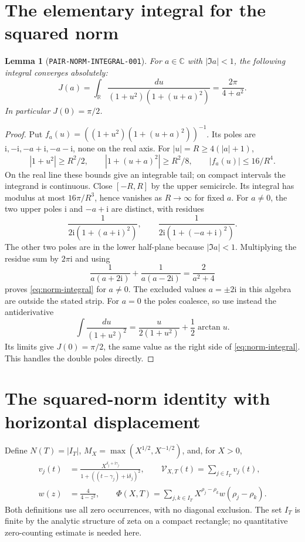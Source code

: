 \documentclass[11pt]{article}
\newtheorem{lemma}{Lemma}
\newcommand{\ii}{\mathrm i}
\newcommand{\VS}{\mathcal V}
\begin{document}
\section{The elementary integral for the squared norm}

\begin{lemma}[\texttt{PAIR-NORM-INTEGRAL-001}]\label{lem:norm-integral}
For \(a\in\mathbb C\) with \(|\Im a|<1\), the following integral
converges absolutely:
\begin{equation}\label{eq:norm-integral}
 J(a)=\int_{\mathbb R}\frac{du}{(1+u^2)(1+(u+a)^2)}
      =\frac{2\pi}{4+a^2}.
\end{equation}
In particular \(J(0)=\pi/2\).
\end{lemma}
\begin{proof}
Put \(f_a(u)=((1+u^2)(1+(u+a)^2))^{-1}\).
Its poles are \(\ii,-\ii,-a+\ii,-a-\ii\), none on the real axis.
For \(|u|=R\geq4(|a|+1)\),
\[
 |1+u^2|\geq R^2/2,\qquad
 |1+(u+a)^2|\geq R^2/8,\qquad |f_a(u)|\leq16/R^4.
\]
On the real line these bounds give an integrable tail; on compact
intervals the integrand is continuous. Close \([-R,R]\) by the upper
semicircle. Its integral has modulus at most \(16\pi/R^3\), hence
vanishes as \(R\to\infty\) for fixed \(a\).
For \(a\ne0\), the two upper poles \(\ii\) and \(-a+\ii\)
are distinct, with residues
\[
 \frac1{2\ii(1+(a+\ii)^2)},\qquad
 \frac1{2\ii(1+(-a+\ii)^2)}.
\]
The other two poles are in the lower half-plane because \(|\Im a|<1\).
Multiplying the residue sum by \(2\pi\ii\) and using
\[
 \frac1{a(a+2\ii)}+\frac1{a(a-2\ii)}=\frac2{a^2+4}
\]
proves \eqref{eq:norm-integral} for \(a\ne0\). The excluded
values \(a=\pm2\ii\) in this algebra are outside the stated strip.
For \(a=0\) the poles coalesce, so use instead the antiderivative
\[
 \int\frac{du}{(1+u^2)^2}
 =\frac{u}{2(1+u^2)}+\frac12\arctan u.
\]
Its limits give \(J(0)=\pi/2\), the same value as the right side of
\eqref{eq:norm-integral}. This handles the double poles directly.
\end{proof}

\section{The squared-norm identity with horizontal displacement}

Define \(N(T)=|I_T|\),
\(M_X=\max(X^{1/2},X^{-1/2})\), and, for \(X>0\),
\begin{align}
 v_j(t)&=\frac{X^{\delta_j+\ii\gamma_j}}
                  {1+((t-\gamma_j)+\ii\delta_j)^2},\qquad
 \VS_{X,T}(t)=\sum_{j\in I_T}v_j(t),\label{eq:norm-vector}\\
 w(z)&=\frac4{4-z^2},\qquad
 \Phi(X,T)=\sum_{j,k\in I_T}X^{\rho_j-\rho_k}w(\rho_j-\rho_k).
 \label{eq:norm-pair-definition}
\end{align}
Both definitions use all zero occurrences, with no diagonal exclusion.
The set \(I_T\) is finite by the analytic structure of zeta on a compact
rectangle; no quantitative zero-counting estimate is needed here.
\end{document}
